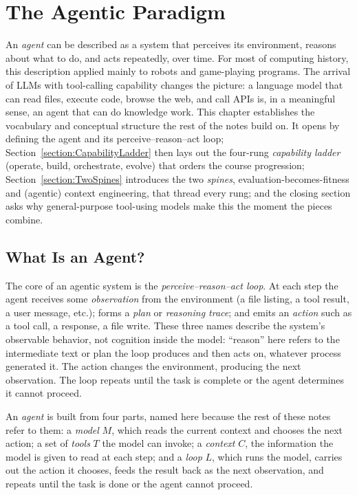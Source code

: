 \chapter{The Agentic Paradigm}
\label{chapter:AgenticParadigm}

An \emph{agent} can be described as a system that perceives its environment, reasons about what to do, and acts repeatedly, over time.
For most of computing history, this description applied mainly to robots and game-playing programs.
The arrival of LLMs with tool-calling capability changes the picture: a language model that can read files, execute code, browse the web, and call APIs is, in a meaningful sense, an agent that can do knowledge work.
This chapter establishes the vocabulary and conceptual structure the rest of the notes build on.
It opens by defining the agent and its perceive--reason--act loop; Section~\ref{section:CapabilityLadder} then lays out the four-rung \emph{capability ladder} (operate, build, orchestrate, evolve) that orders the course progression; Section~\ref{section:TwoSpines} introduces the two \emph{spines}, evaluation-becomes-fitness and (agentic) context engineering, that thread every rung; and the closing section asks why general-purpose tool-using models make this the moment the pieces combine.

\section{What Is an Agent?}

The core of an agentic system is the \emph{perceive–reason–act loop}.
At each step the agent receives some \emph{observation} from the environment (a file listing, a tool result, a user message, etc.); forms a \emph{plan} or \emph{reasoning trace}; and emits an \emph{action} such as a tool call, a response, a file write.
These three names describe the system's observable behavior, not cognition inside the model: ``reason'' here refers to the intermediate text or plan the loop produces and then acts on, whatever process generated it.
The action changes the environment, producing the next observation.
The loop repeats until the task is complete or the agent determines it cannot proceed.

\begin{definition}
An \emph{agent} is built from four parts, named here because the rest of these notes refer to them: a \emph{model} $M$, which reads the current context and chooses the next action; a set of \emph{tools} $T$ the model can invoke; a \emph{context} $C$, the information the model is given to read at each step; and a \emph{loop} $L$, which runs the model, carries out the action it chooses, feeds the result back as the next observation, and repeats until the task is done or the agent cannot proceed.
\end{definition}

